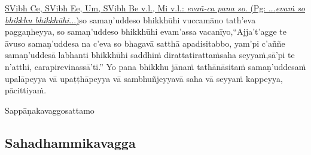 {{{		\hypertarget{endnote373-appendix}{\hyperlink{endnote373-body}{SVibh Ce, SVibh Ee, Um, SVibh Be v.l., Mi v.l.: \textit{evañ-ca pana so}. (Pg: ...\textit{evaṁ so bhikkhu bhikkhūhi}...)}}}}}\makeatother \thinspace so samaṇ'uddeso bhikkhūhi vuccamāno tath'eva paggaṇheyya, so samaṇ'uddeso bhikkhūhi evam'assa vacanīyo,\makeatletter\hyperlink{endnote374-appendix}\makeatother \thinspace ``Ajja't'agge te āvuso samaṇ'uddesa na c'eva so bhagavā satthā apadisitabbo, yam'pi c'aññe samaṇ'uddesā labhanti bhikkhūhi saddhiṁ dirattatirattaṁ\makeatletter\hyperlink{endnote375-appendix}\makeatother \thinspace saha seyyaṁ,\makeatletter\hyperlink{endnote376-appendix}\makeatother \thinspace sā'pi te n'atthi, carapire\makeatletter\hyperlink{endnote377-appendix}\makeatother \thinspace vinassā'ti.'' Yo pana bhikkhu jānaṁ tathānāsitaṁ samaṇ'uddesaṁ upalāpeyya vā upaṭṭhāpeyya vā sambhuñjeyya\makeatletter\hyperlink{endnote378-appendix}\makeatother \thinspace vā saha vā seyyaṁ kappeyya, pācittiyaṁ.

\begin{center}
	Sappāṇakavaggo\makeatletter\hyperlink{endnote379-appendix}\makeatother \thinspace sattamo
\end{center}



\subsection{Sahadhammikavagga}

